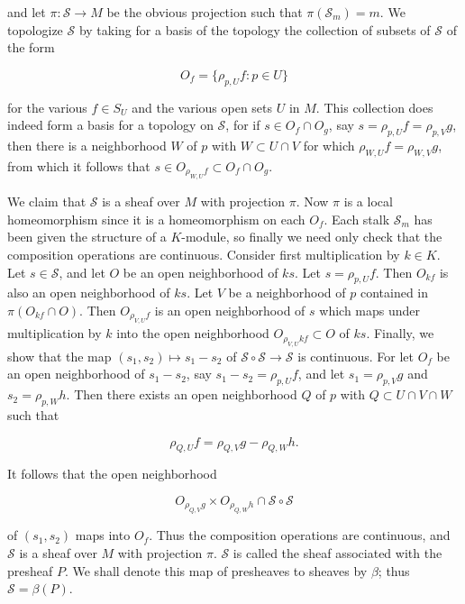 and let $\pi: \mathcal{S} \to M$ be the obvious projection such that $\pi(\mathcal{S}_m) = m$. We topologize $\mathcal{S}$ by taking for a basis of the topology the collection of subsets of $\mathcal{S}$ of the form

\begin{equation}
\tag{6}\label{eq:5.6:6}
O_{f}=\{\rho_{p,U}f\colon p\in U\}
\end{equation}

for the various $f\in S_U$ and the various open sets $U$ in $M$. This collection does indeed form a basis for a topology on $\mathcal{S}$, for if $s\in O_f\cap O_g$, say $s=\rho_{p,U}f=\rho_{p,V}g$, then there is a neighborhood $W$ of $p$ with $W\subset U\cap V$ for which $\rho_{W,U}f=\rho_{W,V}g$, from which it follows that $s\in O_{\rho_{W,U}f}\subset O_f\cap O_g$.

We claim that $\mathcal{S}$ is a sheaf over $M$ with projection $\pi$. Now $\pi$ is a local homeomorphism since it is a homeomorphism on each $O_f$. Each stalk $\mathcal{S}_m$ has been given the structure of a $K$-module, so finally we need only check that the composition operations are continuous. Consider first multiplication by $k \in K$. Let $s \in \mathcal{S}$, and let $O$ be an open neighborhood of $ks$. Let $s = \rho_{p,U}f$. Then $O_{k f}$ is also an open neighborhood of $ks$. Let $V$ be a neighborhood of $p$ contained in $\pi(O_{k f} \cap O)$. Then $O_{\rho_{V,U}f}$ is an open neighborhood of $s$ which maps under multiplication by $k$ into the open neighborhood $O_{\rho_{V,U}kf} \subset O$ of $ks$. Finally, we show that the map $(s_1, s_2) \mapsto s_1 - s_2$ of $\mathcal{S} \circ \mathcal{S} \to \mathcal{S}$ is continuous. For let $O_f$ be an open neighborhood of $s_1 - s_2$, say $s_1 - s_2 = \rho_{p,U}f$, and let $s_1 = \rho_{p,V}g$ and $s_2 = \rho_{p,W}h$. Then there exists an open neighborhood $Q$ of $p$ with $Q \subset U \cap V \cap W$ such that

\begin{equation}
\tag{7}\label{eq:5.6:7}
\rho_{Q,U}f=\rho_{Q,V}g-\rho_{Q,W}h.
\end{equation}

It follows that the open neighborhood

\begin{equation}
\tag{8}\label{eq:5.6:8}
O_{\rho_{Q,V}g}\times O_{\rho_{Q,W}h}\cap\mathcal{S}\circ\mathcal{S}
\end{equation}

of $(s_{1}, s_{2})$ maps into $O_{f}$. Thus the composition operations are continuous, and $\mathcal{S}$ is a sheaf over $M$ with projection $\pi$. $\mathcal{S}$ is called the sheaf associated with the presheaf $P$. We shall denote this map of presheaves to sheaves by $\beta$; thus $\mathcal{S} = \beta(P)$.

